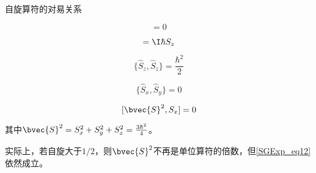 \begin{theorem}{自旋算符的对易关系}

\begin{equation}
[\hat{S}_z, \hat{S}_z]=0
\end{equation}

\begin{equation}
[\hat{S}_x, \hat{S}_y]=\I\hbar S_z
\end{equation}

\begin{equation}\label{SGExp_eq11}
\{\hat{S}_z, \hat{S}_z\}=\frac{\hbar^2}{2}
\end{equation}

\begin{equation}
\{\hat{S}_x, \hat{S}_y\}=0
\end{equation}

\begin{equation}\label{SGExp_eq12}
[\bvec{S}^2, S_x]=0
\end{equation}

其中$\bvec{S}^2=S_x^2+S_y^2+S_z^2=\frac{3\hbar^2}{4}$。

\end{theorem}

实际上，若自旋大于$1/2$，则$\bvec{S}^2$不再是单位算符的倍数，但\autoref{SGExp_eq12} 依然成立。










